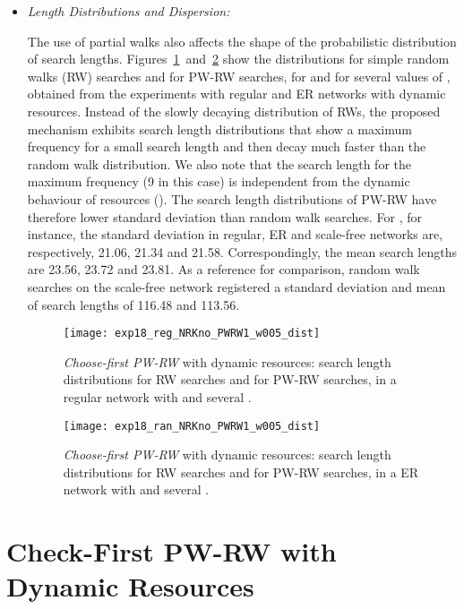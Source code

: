 \documentclass[]{elsarticle}
\begin{document}
\begin{itemize}
\item{\it Length Distributions and Dispersion:}

The use of partial walks also affects the shape of the probabilistic distribution of search lengths. Figures~\ref{fig:regular_dist}~and~\ref{fig:random_dist} show the distributions for simple random walks (RW) searches and for PW-RW searches, for  and for several values of \pd, obtained from the experiments with regular and ER networks with dynamic resources. Instead of the slowly decaying distribution of RWs, the proposed mechanism exhibits search length distributions that show a maximum frequency for a small search length and then decay much faster than the random walk distribution. We also note that the search length for the maximum frequency (9 in this case) is independent from the dynamic behaviour of resources (\pd). The search length distributions of PW-RW have therefore lower standard deviation than random walk searches. For , for instance, the standard deviation in regular, ER and scale-free networks are, respectively, 21.06, 21.34 and 21.58. Correspondingly, the mean search lengths are 23.56, 23.72 and 23.81. As a reference for comparison, random walk searches on the scale-free network registered a standard deviation and mean of search lengths of 116.48 and 113.56.

\begin{figure}[h]
 \centering
 \texttt{[image: exp18\_reg\_NRKno\_PWRW1\_w005\_dist]}
 \caption{\emph{Choose-first PW-RW} with dynamic resources: search length distributions for RW searches and for PW-RW searches, in a regular network with  and several .}
 \label{fig:regular_dist}
\end{figure}

\begin{figure}[h]
 \centering
 \texttt{[image: exp18\_ran\_NRKno\_PWRW1\_w005\_dist]}
 \caption{\emph{Choose-first PW-RW} with dynamic resources: search length distributions for RW searches and for PW-RW searches, in a ER network with  and several .}
 \label{fig:random_dist}
\end{figure}

\end{itemize}

\section{Check-First PW-RW with Dynamic Resources}
\end{document}

